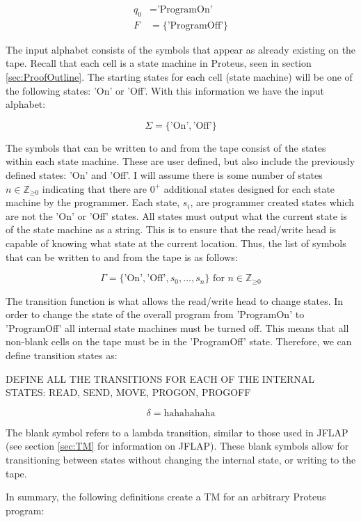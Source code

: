 \[
    \begin{aligned}
        q_{0} &= \text{'ProgramOn'} \\
        F &= \{\text{'ProgramOff'}\}
    \end{aligned}
\] 

The input alphabet consists of the symbols that appear as already existing on the tape.
Recall that each cell is a state machine in Proteus, seen in section \ref{sec:ProofOutline}.
The starting states for each cell (state machine) will be one of the following states: 'On' or 'Off'.
With this information we have the input alphabet:

\[
\Sigma = \{\text{'On'}, \text{'Off'}\}
\]

The symbols that can be written to and from the tape consist of the states within each state machine.
These are user defined, but also include the previously defined states: 'On' and 'Off'.
I will assume there is some number of states $n \in \mathbb{Z}_{\geq \text{0}}$ indicating that there are $0^{+}$ additional states designed for each state machine by the programmer.
Each state, $s_i$, are programmer created states which are not the 'On' or 'Off' states.
All states must output what the current state is of the state machine as a string.
This is to ensure that the read/write head is capable of knowing what state at the current location.
Thus, the list of symbols that can be written to and from the tape is as follows:

\[
\Gamma = \{\text{'On'}, \text{'Off'}, s_{0}, \dots, s_{n}\} \text{ for } n \in \mathbb{Z}_{\geq \text{0}}
\]

The transition function is what allows the read/write head to change states.
In order to change the state of the overall program from 'ProgramOn' to 'ProgramOff' all internal state machines must be turned off.
This means that all non-blank cells on the tape must be in the 'ProgramOff' state.
Therefore, we can define transition states as:

DEFINE ALL THE TRANSITIONS FOR EACH OF THE INTERNAL STATES: READ, SEND, MOVE, PROGON, PROGOFF

\[
\delta = \text{hahahahaha}
\]

The blank symbol refers to a lambda transition, similar to those used in JFLAP (see section \ref{sec:TM} for information on JFLAP).
These blank symbols allow for transitioning between states without changing the internal state, or writing to the tape.

In summary, the following definitions create a TM for an arbitrary Proteus program:

